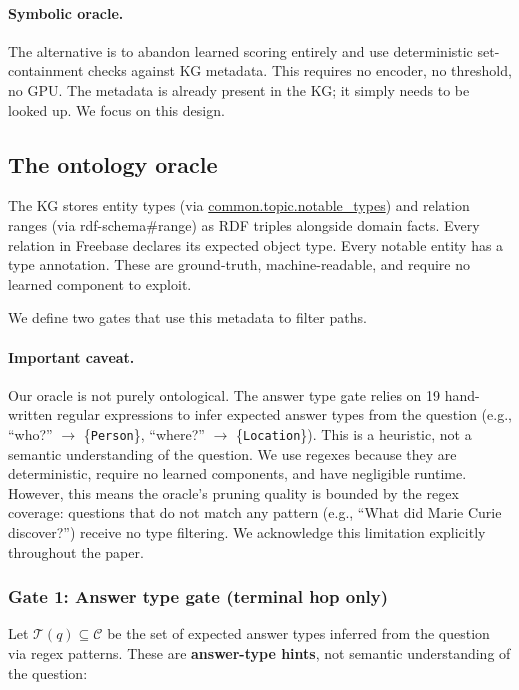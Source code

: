 \documentclass[11pt,twoside]{article}
\begin{document}
\paragraph{Symbolic oracle.}
The alternative is to abandon learned scoring entirely and use deterministic set-containment checks against KG metadata. This requires no encoder, no threshold, no GPU. The metadata is already present in the KG; it simply needs to be looked up. We focus on this design.

\subsection{The ontology oracle}

The KG stores entity types (via \url{common.topic.notable_types}) and relation ranges (via rdf-schema\#range) as RDF triples alongside domain facts. Every relation in Freebase declares its expected object type. Every notable entity has a type annotation. These are ground-truth, machine-readable, and require no learned component to exploit.

We define two gates that use this metadata to filter paths.

\paragraph{Important caveat.} Our oracle is not purely ontological. The answer type gate relies on 19 hand-written regular expressions to infer expected answer types from the question (e.g., ``who?'' \(\to\) \{\texttt{Person}\}, ``where?'' \(\to\) \{\texttt{Location}\}). This is a heuristic, not a semantic understanding of the question. We use regexes because they are deterministic, require no learned components, and have negligible runtime. However, this means the oracle's pruning quality is bounded by the regex coverage: questions that do not match any pattern (e.g., ``What did Marie Curie discover?'') receive no type filtering. We acknowledge this limitation explicitly throughout the paper.

\subsubsection{Gate 1: Answer type gate (terminal hop only)}

Let \(\mathcal{T}(q) \subseteq \mathcal{C}\) be the set of expected answer types inferred from the question via regex patterns. These are \textbf{answer-type hints}, not semantic understanding of the question:
\end{document}

